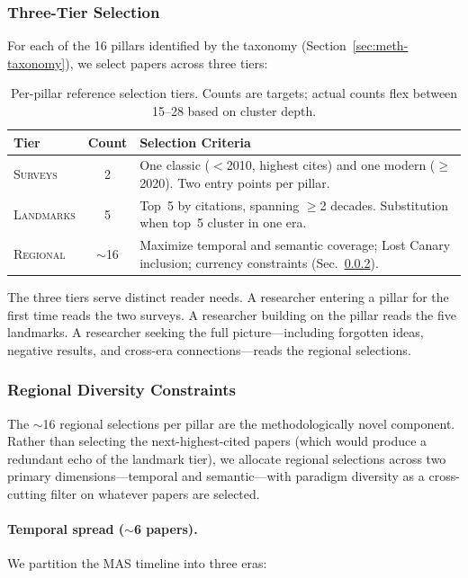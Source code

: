 \documentclass{article}
\begin{document}
\subsubsection{Three-Tier Selection}

For each of the 16 pillars identified by the taxonomy (Section~\ref{sec:meth-taxonomy}),
we select papers across three tiers:

\begin{table}[h]
\centering
\caption{Per-pillar reference selection tiers. Counts are targets;
         actual counts flex between 15--28 based on cluster depth.}
\label{tab:ref-tiers}
\small
\begin{tabular}{@{} l c p{4.2cm} @{}}
\toprule
\textbf{Tier} & \textbf{Count} & \textbf{Selection Criteria} \\
\midrule
\textsc{Surveys} & 2 & One classic ($<$2010, highest cites) and one modern ($\geq$2020). Two entry points per pillar. \\[4pt]
\textsc{Landmarks} & 5 & Top~5 by citations, spanning $\geq$2 decades. Substitution when top~5 cluster in one era. \\[4pt]
\textsc{Regional} & ${\sim}$16 & Maximize temporal and semantic coverage; Lost Canary inclusion; currency constraints (Sec.~\ref{sec:meth-ref-regional}). \\
\bottomrule
\end{tabular}
\end{table}

\noindent
The three tiers serve distinct reader needs. A researcher entering a pillar for the
first time reads the two surveys. A researcher building on the pillar reads the five
landmarks. A researcher seeking the full picture---including forgotten ideas, negative
results, and cross-era connections---reads the regional selections.

\subsubsection{Regional Diversity Constraints}
\label{sec:meth-ref-regional}

The $\sim$16 regional selections per pillar are the methodologically novel component.
Rather than selecting the next-highest-cited papers (which would produce a redundant
echo of the landmark tier), we allocate regional selections across two primary
dimensions---temporal and semantic---with paradigm diversity as a cross-cutting
filter on whatever papers are selected.

\paragraph{Temporal spread ($\sim$6 papers).}
We partition the MAS timeline into three eras:
\end{document}
